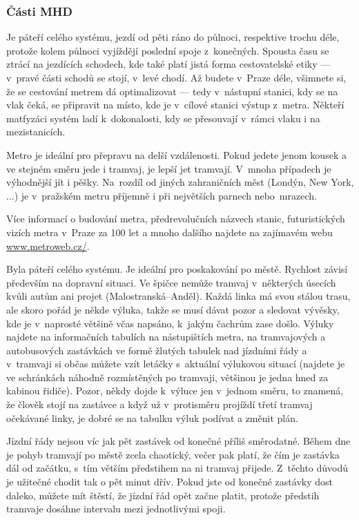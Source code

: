 \subsubsection{Části MHD}
Je páteří celého systému, jezdí od pěti ráno do půlnoci,
respektive trochu déle, protože kolem půlnoci vyjíždějí poslední
spoje z~konečných. Spousta času se ztrácí na jezdících schodech,
kde také platí jistá forma cestovatelské etiky --- v~pravé části
schodů se stojí, v~levé chodí. Až budete v~Praze déle, všimnete
si, že se cestování metrem dá optimalizovat --- tedy v~nástupní
stanici, kdy se na vlak čeká, se připravit na místo, kde je
v~cílové stanici výstup z~metra. Někteří matfyzáci systém ladí
k~dokonalosti, kdy se přesouvají v~rámci vlaku i na mezistanicích.


Metro je ideální pro přepravu na delší vzdálenosti. Pokud jedete
jenom kousek a ve stejném směru jede i tramvaj, je lepší jet
tramvají. V~mnoha případech je výhodnější jít i pěšky. Na~rozdíl
od jiných zahraničních měst (Londýn, New York, ...) je v~pražském
metru příjemně i při největších parnech nebo~mrazech.

Více informací o budování metra, předrevolučních názvech stanic,
futuristických vizích metra v~Praze za 100 let a mnoho dalšího
najdete na zajímavém webu \url{www.metroweb.cz/}.

Byla páteří celého systému. Je ideální pro poskakování po městě.
Rychlost závisí především na dopravní situaci. Ve špičce nemůže
tramvaj v~některých úsecích kvůli autům ani projet
(Malostranská--Anděl). Každá linka má svou stálou trasu, ale skoro
pořád je někde výluka, takže se musí dávat pozor a sledovat
vývěsky, kde je v~naprosté většině včas napsáno, k~jakým čachrům
zase došlo. Výluky najdete na informačních tabulích na
nástupištích metra, na tramvajových a autobusových zastávkách ve
formě žlutých tabulek nad jízdními řády a v~tramvaji si občas
můžete vzít letáčky s~aktuální výlukovou situací (najdete je ve
schránkách náhodně rozmístěných po tramvaji, většinou je jedna
hned za kabinou řidiče). Pozor, někdy dojde k~výluce jen v~jednom
směru, to znamená, že člověk stojí na zastávce a když už
v~protisměru projíždí třetí tramvaj očekávané linky, je dobré se na
tabulku výluk podívat a změnit plán.

Jízdní řády nejsou víc jak pět zastávek od konečné příliš
směrodatné. Během dne je pohyb tramvají po městě zcela chaotický,
večer pak platí, že čím je zastávka dál od začátku, s~tím větším
předstihem na ni tramvaj přijede. Z~těchto důvodů je užitečné
chodit tak o pět minut dřív. Pokud jste od konečné zastávky dost
daleko, můžete mít štěstí, že jízdní řád opět začne platit,
protože předstih tramvaje dosáhne intervalu mezi jednotlivými
spoji.


